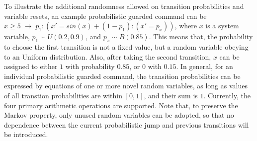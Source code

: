 To illustrate the additional randomness allowed on transition probabilities and variable resets, an example probabilistic guarded command can be $x \geq 5 \; \rightarrow \; p_1:(x' = sin(x) + (1-p_1):(x' = p_x))$, where $x$ is a system variable, $p_1 \sim  U(0.2, 0.9)$, and $p_x  \sim  B(0.85)$. This means that, the probability to choose the first transition is not a fixed value, but a random variable obeying to an Uniform distribution. Also, after taking the second transition, $x$ can be assigned to either $1$ with probability $0.85$, or $0$ with $0.15$. In general, for an individual probabilistic guarded command, the transition probabilities can be expressed by equations of one or more novel random variables, as long as values of all transtion probabilities are within $[0, 1]$, and their sum is $1$. Currently, the four primary arithmetic operations are supported. Note that, to preserve the Markov property, only unused random variables can be adopted, so that no dependence between the current probabilistic jump and previous transitions will be introduced. 





